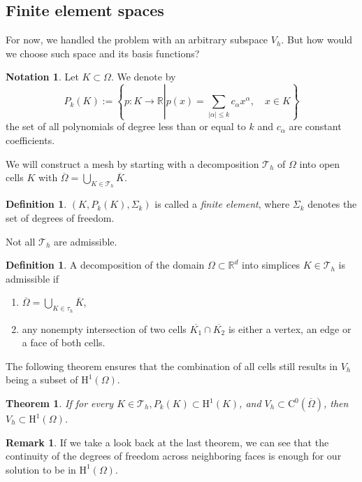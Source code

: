\documentclass[12pt,a4paper,twoside, open=right]{scrreprt}
\theoremstyle{definition}
\newtheorem{rem}[auf]{Remark}
\newtheorem{defn}[auf]{Definition}
\newtheorem{notation}[auf]{Notation}
\theoremstyle{plain}
\newtheorem{sa}[auf]{Theorem}
\newcommand{\abs}[1]{\left\vert #1\right\vert}
\newcommand{\rr}{\mathbb{R}}
\begin{document}
\subsection{Finite element spaces}
\label{subsec:finitelem}
For now, we handled the problem with an arbitrary subspace $V_h$. But how would we choose such space and its basis functions?
\begin{notation}
    Let $K\subset \Omega$. We denote by
    \begin{equation}
        P_k(K):=\left\{p\colon K\to\rr\left\vert p(x)=\sum_{\abs{\alpha}\le k}c_\alpha x^\alpha,\right.\quad x\in K\right\}
    \end{equation}
    the set of all polynomials of degree less than or equal to $k$ and $c_\alpha$ are constant coefficients.
\end{notation}
We will construct a mesh by starting with a decomposition $\mathcal{T}_h$ of $\Omega$ into open cells $K$ with $\overline{\Omega}=\bigcup_{K\in\mathcal{T}_h}\overline{K}$.
\begin{defn}
    $(K,P_k(K),\Sigma_k)$ is called a \emph{finite element}, where $\Sigma_k$ denotes the set of degrees of freedom.
\end{defn}
   Not all $\mathcal{T}_h$ are admissible.
\begin{defn}
    A decomposition of the domain $\Omega\subset\rr^d$ into simplices $K\in\mathcal{T}_h$ is admissible if
    \begin{enumerate}
        \item $\overline{\Omega}=\bigcup_{K\in\tau_h}\overline{K}$,
        \item any nonempty intersection of two cells $\overline{K_1}\cap\overline{K_2}$ is either a vertex, an edge or a face of both cells.
    \end{enumerate}
\end{defn}
The following theorem ensures that the combination of all cells still results in $V_h$ being a subset of $\mathrm{H}^1(\Omega)$.
\begin{sa}
    If for every $K\in\mathcal{T}_h,P_k(K)\subset \mathrm{H}^1(K)$, and $V_h\subset \mathrm{C}^0(\overline\Omega)$, then $V_h\subset \mathrm{H}^1(\Omega)$.
\end{sa}
\begin{rem}
    If we take a look back at the last theorem, we can see that the continuity of the degrees of freedom across neighboring faces is enough for our solution to be in $\mathrm{H}^1(\Omega)$. 
\end{rem}
\end{document}
